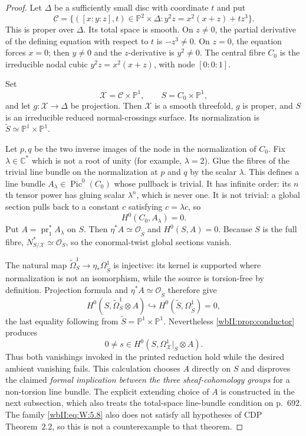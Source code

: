 \begin{proof}
Let $\Delta$ be a sufficiently small disc with coordinate $t$ and put
\[
\mathcal C=
\{([x:y:z],t)\in\mathbb P^2\times\Delta:
y^2z=x^2(x+z)+tz^3\}.
\tag{W.8}\label{wbII:eq:W:5.8}
\]
This is proper over $\Delta$.  Its total space is smooth.  On $z\ne0$, the
partial derivative of the defining equation with respect to $t$ is
$-z^3\ne0$.  On $z=0$, the equation forces $x=0$; then $y\ne0$ and the
$z$-derivative is $y^2\ne0$.  The central fibre $C_0$ is the irreducible
nodal cubic $y^2z=x^2(x+z)$, with node $[0:0:1]$.

Set
\[
\mathcal X=\mathcal C\times\mathbb P^1,\qquad
S=C_0\times\mathbb P^1,
\]
and let $g:\mathcal X\to\Delta$ be projection.  Then $\mathcal X$ is a
smooth threefold, $g$ is proper, and $S$ is an irreducible reduced
normal-crossings surface.  Its normalization is
$\widetilde S\simeq\mathbb P^1\times\mathbb P^1$.

Let $p,q$ be the two inverse images of the node in the normalization of
$C_0$.  Fix $\lambda\in\mathbb C^*$ which is not a root of unity (for
example, $\lambda=2$).  Glue the fibres of
the trivial line bundle on the normalization at $p$ and $q$ by the scalar
$\lambda$.  This defines a line bundle
$A_\lambda\in\operatorname{Pic}^0(C_0)$ whose pullback is trivial.  It has
infinite order: its $n$th tensor power has gluing scalar $\lambda^n$, which
is never one.  It is not trivial: a global section pulls back to a constant
$c$ satisfying
$c=\lambda c$, so
\[
H^0(C_0,A_\lambda)=0.
\tag{W.9}\label{wbII:eq:W:5.9}
\]
Put $A=\operatorname{pr}_1^*A_\lambda$ on $S$.  Then
$\eta^*A\simeq\mathcal O_{\widetilde S}$ and $H^0(S,A)=0$.
Because $S$ is the full fibre,
$N^*_{S/\mathcal X}\simeq\mathcal O_S$, so the conormal-twist global
sections vanish.

The natural map
$\widetilde\Omega^1_S\to\eta_*\Omega^1_{\widetilde S}$ is injective:
its kernel is supported where normalization is not an isomorphism, while
the source is torsion-free by definition.  Projection formula and
$\eta^*A\simeq\mathcal O_{\widetilde S}$ therefore give
\[
H^0(S,\widetilde\Omega^1_S\otimes A)
\hookrightarrow
H^0(\widetilde S,\Omega^1_{\widetilde S})=0,
\tag{W.10}\label{wbII:eq:W:5.10}
\]
the last equality following from
$\widetilde S=\mathbb P^1\times\mathbb P^1$.
Nevertheless \cref{wbII:prop:conductor} produces
\[
0\ne s\in H^0(S,\Omega^1_{\mathcal X}|_S\otimes A).
\]
Thus both vanishings invoked in the printed reduction hold while the desired
ambient vanishing fails.  This calculation chooses $A$ directly on $S$ and disproves the
claimed \emph{formal implication between the three sheaf-cohomology groups}
for a non-torsion line bundle. The explicit extending choice of $A$ is
constructed in the next subsection, which also treats the total-space
line-bundle condition on p.~692.  The family \eqref{wbII:eq:W:5.8} also does not satisfy all hypotheses of CDP
Theorem~2.2, so this is not a counterexample to that theorem.
\end{proof}

